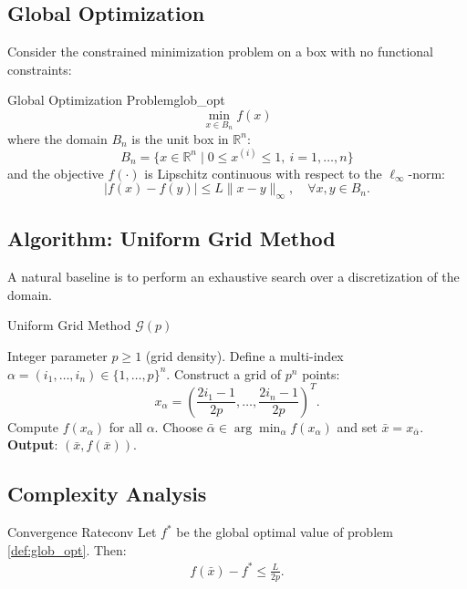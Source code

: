 \documentclass[11pt]{article}
\begin{document}
\subsection{Global Optimization}

Consider the constrained minimization problem on a box with no functional constraints:

\begin{definition}{Global Optimization Problem}{glob_opt}
\begin{equation}
    \min_{x \in B_n} f(x)
\end{equation}
where the domain $B_n$ is the unit box in $\mathbb{R}^n$:
\[ B_n=\{x\in\mathbb{R}^n \mid 0\leq x^{(i)}\leq1,\ i=1,\dots,n\} \]
and the objective $f(\cdot)$ is Lipschitz continuous with respect to the $\ell_\infty$-norm:
\[ |f(x)-f(y)|\leq L\|x-y\|_{\infty}, \quad \forall x,y\in B_n. \]
\end{definition}

\subsection{Algorithm: Uniform Grid Method}

A natural baseline is to perform an exhaustive search over a discretization of the domain.

\begin{algobox}{Uniform Grid Method $\mathcal{G}(p)$}
\begin{algorithmic}[1]
    \Require Integer parameter $p\geq 1$ (grid density).
    \State Define a multi-index $\alpha = (i_1,\dots,i_n) \in \{1,\dots,p\}^n$.
    \State Construct a grid of $p^n$ points: 
    \[ x_\alpha=\left(\frac{2i_1-1}{2p},\dots,\frac{2i_n-1}{2p}\right)^T. \]
    \State Compute $f(x_\alpha)$ for all $\alpha$.
    \State Choose $\bar\alpha\in\arg\min_{\alpha}f(x_\alpha)$ and set $\bar x=x_{\bar\alpha}$.
    \State \textbf{Output}: $(\bar{x},f(\bar{x}))$.
\end{algorithmic}
\end{algobox}

\subsection{Complexity Analysis}

\begin{theorem}{Convergence Rate}{conv}
Let $f^*$ be the global optimal value of problem \ref{def:glob_opt}. Then:
\begin{align*}
    f(\bar{x})-f^*\leq \frac{L}{2p}.
\end{align*}
\end{theorem}
\end{document}
